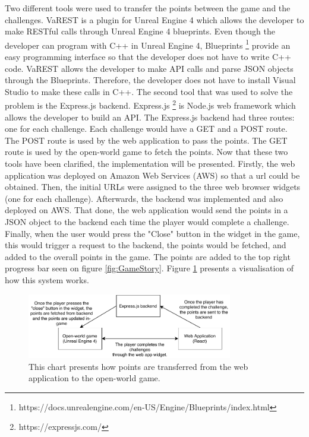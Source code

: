 \documentclass{l4proj}
\begin{document}
Two different tools were used to transfer the points between the game and the challenges.
VaREST is a plugin for Unreal Engine 4 which allows the developer to make RESTful calls through Unreal Engine 4 blueprints.
Even though the developer can program with C++ in Unreal Engine 4, 
Blueprints \footnote{https://docs.unrealengine.com/en-US/Engine/Blueprints/index.html} 
provide an easy programming interface so that the developer does not have to write C++ code.
VaREST allows the developer to make API calls and parse JSON objects through the Blueprints. 
Therefore, the developer does not have to install Visual Studio to make these calls in C++.
The second tool that was used to solve the problem is the Express.js backend.
Express.js \footnote{https://expressjs.com/} is Node.js web framework which allows the developer to build an API.
The Express.js backend had three routes: one for each challenge. Each challenge would have a GET and a POST route.
The POST route is used by the web application to pass the points. 
The GET route is used by the open-world game to fetch the points.
Now that these two tools have been clarified, the implementation will be presented.
Firstly, the web application was deployed on Amazon Web Services (AWS) so that a url could be obtained.
Then, the initial URLs were assigned to the three web browser widgets (one for each challenge).
Afterwards, the backend was implemented and also deployed on AWS.
That done, the web application would send the points in a JSON object to the backend each time the player would complete a challenge.
Finally, when the user would press the "Close" button in the widget in the game, 
this would trigger a request to the backend, the points would be fetched, and added to the overall points in the game.
The points are added to the top right progress bar seen on figure \ref{fig:GameStory}.
Figure \ref{fig:pointsImp} presents a visualisation of how this system works.

\begin{figure}[]
    \centering
    \includegraphics[width=0.8\textwidth, frame]{images/PointsImplementation.pdf}
    \caption{This chart presents how points are transferred from the web application to the open-world game.}
    \label{fig:pointsImp}
\end{figure}
\end{document}
